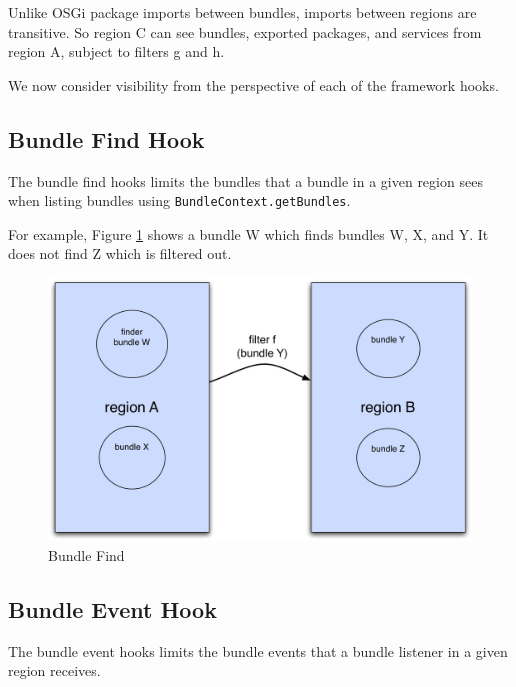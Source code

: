 \documentclass[a4paper,9pt]{article}
\begin{document}
Unlike OSGi package imports between bundles, imports between regions are transitive.
So region C can see bundles, exported packages, and services from region A, subject to filters g and h.

We now consider visibility from the perspective of each of the framework hooks.

\subsection{Bundle Find Hook}

The bundle find hooks limits the bundles that a bundle in a given region sees when listing bundles using
\texttt{BundleContext.getBundles}.

For example, Figure \ref{fig:bfind} shows a bundle W which finds bundles W, X, and Y.
It does not find Z which is filtered out. 
\begin{figure}[h!]
\begin{center}
\includegraphics*[scale=0.4]{bundle-find.pdf}
\caption{Bundle Find \label{fig:bfind}}
\end{center}
\end{figure}

\subsection{Bundle Event Hook}

The bundle event hooks limits the bundle events that a bundle listener in a given region receives.
\end{document}
